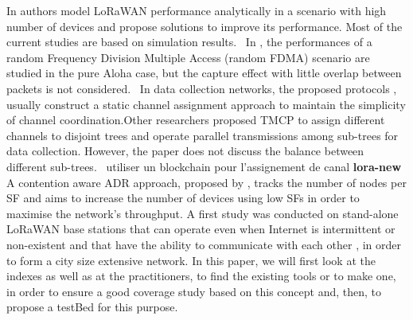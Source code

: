  \cite{bankov_limits_nodate}   In \cite{bankov_limits_2016} authors model LoRaWAN performance analytically in a scenario with high number of devices and propose solutions to improve its performance. Most of the current studies are based on simulation results.~   \newline 
 \cite{goursaud_random_2016}   In \cite{goursaud_random_2016}, the performances of a random Frequency Division Multiple Access (random FDMA) scenario are studied in the pure Aloha case, but the capture effect with little overlap between packets is not considered.~   \newline 
 \cite{wu_realistic_2008}   In data collection networks, the proposed protocols \cite{wu_realistic_2008}, \cite{liew_fast_2018} usually construct a static channel assignment approach to maintain the simplicity of channel coordination.Other researchers \cite{wu_realistic_2008} proposed TMCP to assign different channels to disjoint trees and operate parallel transmissions among sub-trees for data collection. However, the paper does not discuss the balance between different sub-trees.~   \newline 
 \cite{angelakis_allocation_2016}    \newline 
 \cite{cui_partially_2011}    \newline 
 \cite{jorke_urban_2017}    \newline 
 \cite{krendzel_wireless_2012}    \newline 
 \cite{masonta_adaptive_2015}    \newline 
 \cite{muqattash_single-channel_2004}    \newline 
 \cite{tang_intelligent_2018}   utiliser un blockchain pour l'assignement de canal   \newline 
\textbf{lora-new} \newline  \cite{kim_contention-aware_2018}   A contention aware ADR approach, proposed by \cite{kim_contention-aware_2018}, tracks the number of nodes per SF and aims to increase the number of devices using low SFs in order to maximise the network's throughput.   \newline 
 \cite{barro_tltn_2019}   A first study \cite{barro_tltn_2019} was conducted on stand-alone LoRaWAN base stations that can operate even when Internet is intermittent or non-existent and that have the ability to communicate with each other \cite{barro_smart_2019}, in order to form a city size extensive network. In this paper, we will first look at the indexes as well as at the practitioners, to find the existing tools or to make one, in order to ensure a good coverage study based on this concept and, then, to propose a testBed for this purpose.~   \newline 
